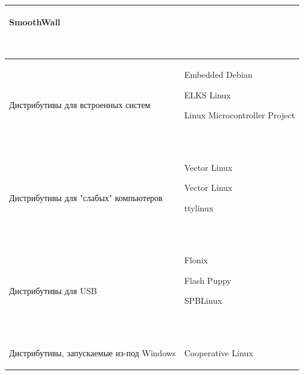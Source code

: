 \documentclass[bachelor, och, referat, times]{SCWorks}
\begin{document}
\begin{longtable}{|p{}|p{}|}
\begin{minipage}{\textwidth}
\begin{list}{•}{~}
            \item SmoothWall
        \end{list}
        ~
    \end{minipage}
    \\\hline
    Дистрибутивы для встроенных систем &
    \begin{minipage}{\textwidth}
        \begin{list}{•}{~}
            \item Embedded Debian
            \item ELKS Linux
            \item Linux Microcontroller Project
        \end{list}
        ~
    \end{minipage}
    \\\hline
    Дистрибутивы для "слабых" компьютеров &
    \begin{minipage}{\textwidth}
        \begin{list}{•}{~}
            \item Vector Linux
            \item Vector Linux
            \item ttylinux
        \end{list}
        ~
    \end{minipage}
    \\\hline
    Дистрибутивы для USB &
    \begin{minipage}{\textwidth}
        \begin{list}{•}{~}
            \item Flonix
            \item Flash Puppy
            \item SPBLinux
        \end{list}
        ~
    \end{minipage}
    \\\hline
    Дистрибутивы, запускаемые из-под Windows &
    \begin{minipage}{\textwidth}
        \begin{list}{•}{~}
            \item Cooperative Linux
        \end{list}
        
    \end{minipage}
    \hline
\end{longtable}
\end{document}
